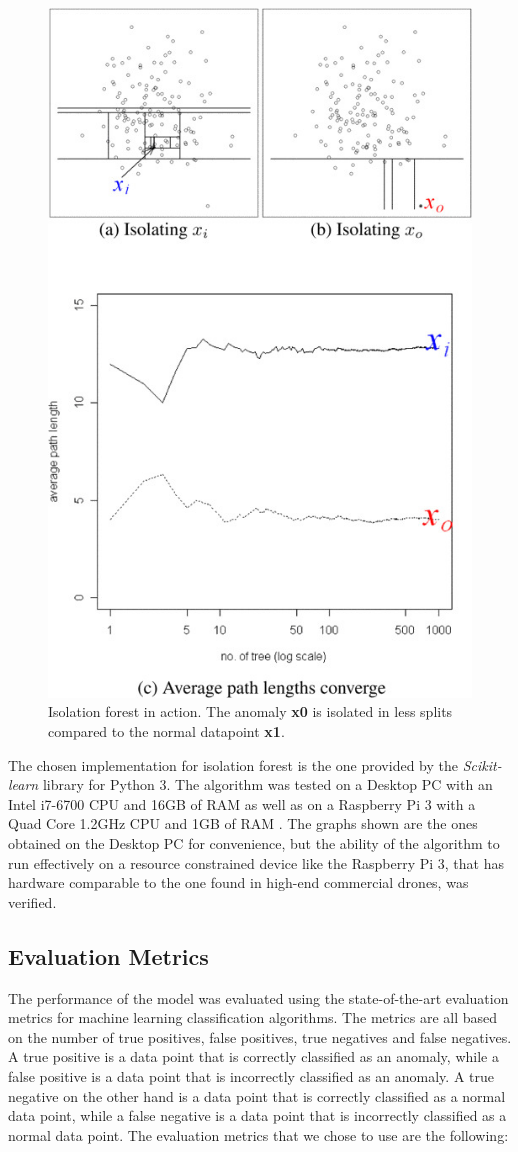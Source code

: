 \documentclass[futureinternet,article,submit,pdftex,moreauthors]{Definitions/mdpi}
\begin{document}
\begin{figure}[H]
	\includegraphics[width=6 cm]{img/IsolationForest.jpg}
	\caption{Isolation forest in action. The anomaly \textbf{x0} is isolated in less splits compared to the normal datapoint \textbf{x1}\cite{IsolationForestLiu}.}
	\label{fig:IsolationForest}
\end{figure}   
\unskip

The chosen implementation for isolation forest is the one provided by the \textit{Scikit-learn} library \cite{IsolationForestScikitLearn} for Python 3. 
The algorithm was tested on a Desktop PC with an Intel i7-6700 CPU and 16GB of RAM as well as on a Raspberry Pi 3 with a Quad Core 1.2GHz CPU and 1GB of RAM \cite{RaspberryPi3ModelB}.
The graphs shown are the ones obtained on the Desktop PC for convenience,  but the ability of the algorithm to run effectively on a resource constrained device like the Raspberry Pi 3, that has hardware comparable to the one found in high-end commercial drones, was verified. 

\subsection{Evaluation Metrics}\label{EvaluationMetrics}

The performance of the model was evaluated using the state-of-the-art evaluation metrics for machine learning classification algorithms. The metrics are all based on the number of true positives, false positives, true negatives and false negatives. A true positive is a data point that is correctly classified as an anomaly, while a false positive is a data point that is incorrectly classified as an anomaly. A true negative on the other hand is a data point that is correctly classified as a normal data point, while a false negative is a data point that is incorrectly classified as a normal data point.
The evaluation metrics that we chose to use are the following: 
\end{document}
